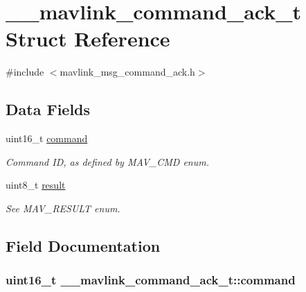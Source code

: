 \hypertarget{struct____mavlink__command__ack__t}{\section{\+\_\+\+\_\+mavlink\+\_\+command\+\_\+ack\+\_\+t Struct Reference}
\label{struct____mavlink__command__ack__t}
}


{\ttfamily \#include $<$mavlink\+\_\+msg\+\_\+command\+\_\+ack.\+h$>$}

\subsection*{Data Fields}
\begin{DoxyCompactItemize}
\item 
uint16\+\_\+t \hyperlink{struct____mavlink__command__ack__t_a4c63e16e7da216bf952f61e33a4ad5e7}{command}
\begin{DoxyCompactList}\small\item\em Command I\+D, as defined by M\+A\+V\+\_\+\+C\+M\+D enum. \end{DoxyCompactList}\item 
uint8\+\_\+t \hyperlink{struct____mavlink__command__ack__t_ae8165e8e4f7a1438977e1a7edd646b69}{result}
\begin{DoxyCompactList}\small\item\em See M\+A\+V\+\_\+\+R\+E\+S\+U\+L\+T enum. \end{DoxyCompactList}\end{DoxyCompactItemize}


\subsection{Field Documentation}
\hypertarget{struct____mavlink__command__ack__t_a4c63e16e7da216bf952f61e33a4ad5e7}{
\subsubsection[{command}]{\setlength{\rightskip}{0pt plus 5cm}uint16\+\_\+t \+\_\+\+\_\+mavlink\+\_\+command\+\_\+ack\+\_\+t\+::command}}\label{struct____mavlink__command__ack__t_a4c63e16e7da216bf952f61e33a4ad5e7}



